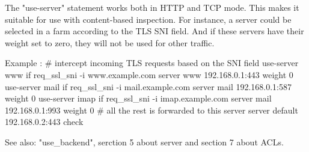   The "use-server" statement works both in HTTP and TCP mode. This makes it
  suitable for use with content-based inspection. For instance, a server could
  be selected in a farm according to the TLS SNI field. And if these servers
  have their weight set to zero, they will not be used for other traffic.

  Example :
     # intercept incoming TLS requests based on the SNI field
     use-server www if { req_ssl_sni -i www.example.com }
     server     www 192.168.0.1:443 weight 0
     use-server mail if { req_ssl_sni -i mail.example.com }
     server     mail 192.168.0.1:587 weight 0
     use-server imap if { req_ssl_sni -i imap.example.com }
     server     mail 192.168.0.1:993 weight 0
     # all the rest is forwarded to this server
     server  default 192.168.0.2:443 check

  See also: "use_backend", serction 5 about server and section 7 about ACLs.
